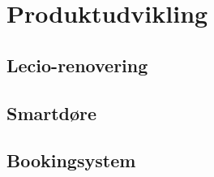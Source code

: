 \section{Produktudvikling}
    \subsection{Lecio-renovering}

    \subsection{Smartdøre}

    \subsection{Bookingsystem}